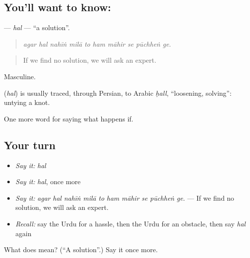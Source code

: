 \subsection*{You'll want to know: }
\textbf{} — \emph{hal} — \textquotedblleft{}a solution\textquotedblright{}.

\begin{quote}
         
\end{quote}

\begin{quote}
\emph{agar hal nahīṅ milā to ham māhir se pūchheṅ ge.}
\end{quote}

\begin{quote}
If we find no solution, we will ask an expert.
\end{quote}

Masculine.

\begin{cousinweb}
\textbf{} (\emph{hal}) is usually traced, through Persian, to Arabic \emph{ḥall}, \textquotedblleft{}loosening, solving\textquotedblright{}: untying a knot.
\end{cousinweb}

\begin{grammarlens}[title={What you've built}]
One more word for saying what happens if.
\end{grammarlens}

\subsection*{Your turn}
\begin{itemize}
\raggedright
  \item \emph{Say it:} \emph{hal}
  \item \emph{Say it:} \emph{hal}, once more
  \item \emph{Say it:} \emph{agar hal nahīṅ milā to ham māhir se pūchheṅ ge.} — If we find no solution, we will ask an expert.
  \item \emph{Recall:} say the Urdu for a hassle, then the Urdu for an obstacle, then say \emph{hal} again
\end{itemize}

\begin{tcolorbox}[breakable,colback=teal!4,colframe=teal!35!black,title={Before you move on}]
What does  mean? (\textquotedblleft{}A solution\textquotedblright{}.) Say it once more.
\end{tcolorbox}
